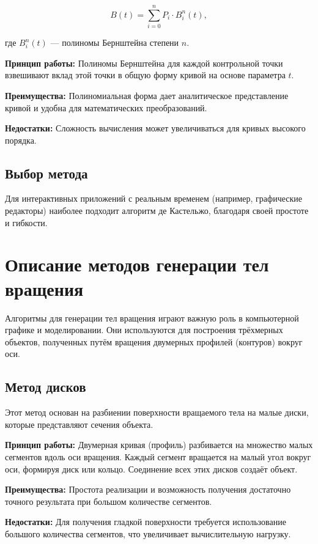 $$ B(t) = \sum\limits_{i=0}^n P_i \cdot B_i^n(t), $$

где $B_i^n(t)$ — полиномы Бернштейна степени $n$.

\textbf{Принцип работы:} Полиномы Бернштейна для каждой контрольной точки взвешивают вклад этой точки в общую форму кривой на основе параметра $t$.

\textbf{Преимущества:} Полиномиальная форма дает аналитическое представление кривой и удобна для математических преобразований.

\textbf{Недостатки:} Сложность вычисления может увеличиваться для кривых высокого порядка.

\subsection{Выбор метода}

Для интерактивных приложений с реальным временем (например, графические редакторы) наиболее подходит алгоритм де Кастельжо, благодаря своей простоте и гибкости.

\section{Описание методов генерации тел вращения}

Алгоритмы для генерации тел вращения играют важную роль в компьютерной графике и моделировании. Они используются для построения трёхмерных объектов, полученных путём вращения двумерных профилей (контуров) вокруг оси.

\subsection{Метод дисков}

Этот метод основан на разбиении поверхности вращаемого тела на малые диски, которые представляют сечения объекта.

\textbf{Принцип работы:} Двумерная кривая (профиль) разбивается на множество малых сегментов вдоль оси вращения. Каждый сегмент вращается на малый угол вокруг оси, формируя диск или кольцо. Соединение всех этих дисков создаёт объект.

\textbf{Преимущества:} Простота реализации и возможность получения достаточно точного результата при большом количестве сегментов.

\textbf{Недостатки:} Для получения гладкой поверхности требуется использование большого количества сегментов, что увеличивает вычислительную нагрузку.

